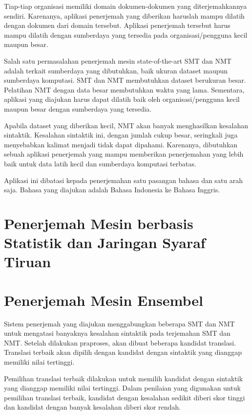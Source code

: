 \documentclass[conference]{IEEEtran}
\begin{document}
Tiap-tiap organisasi memiliki domain dokumen-dokumen yang diterjemahkannya sendiri. Karenanya, aplikasi penerjemah yang diberikan haruslah mampu dilatih dengan dokumen dari domain tersebut. Aplikasi penerjemah tersebut harus mampu dilatih dengan sumberdaya yang tersedia pada organisasi/pengguna kecil maupun besar.

Salah satu permasalahan penerjemah mesin state-of-the-art SMT dan NMT adalah terkait sumberdaya yang dibutuhkan, baik ukuran dataset maupun sumberdaya komputasi. SMT dan NMT membutuhkan dataset berukuran besar. Pelatihan NMT dengan data besar membutuhkan waktu yang lama. Sementara, aplikasi yang diajukan harus dapat dilatih baik oleh organisasi/pengguna kecil maupun besar dengan sumberdaya yang tersedia.

Apabila dataset yang diberikan kecil, NMT akan banyak menghasilkan kesalahan sintaktik. Kesalahan sintaktik ini, dengan jumlah cukup besar, seringkali juga menyebabkan kalimat menjadi tidak dapat dipahami. Karenanya, dibutuhkan sebuah aplikasi penerjemah yang mampu memberikan penerjemahan yang lebih baik untuk data latih kecil dan sumberdaya komputasi terbatas.

Aplikasi ini dibatasi kepada penerjemahan satu pasangan bahasa dan satu arah saja. Bahasa yang diajukan adalah Bahasa Indonesia ke Bahasa Inggris.

\section{Penerjemah Mesin berbasis Statistik dan Jaringan Syaraf Tiruan}

\section{Penerjemah Mesin Ensembel}

Sistem penerjemah yang diajukan menggabungkan beberapa SMT dan NMT untuk mengatasi banyaknya kesalahan sintaktik pada terjemahan SMT dan NMT. Setelah dilakukan praproses, akan dibuat beberapa kandidat translasi. Translasi terbaik akan dipilih dengan kandidat dengan sintaktik yang dianggap memiliki nilai tertinggi.

Pemilihan translasi terbaik dilakukan untuk memilih kandidat dengan sintaktik yang dianggap memiliki nilai tertinggi. Dalam penilaian yang digunakan untuk pemilihan translasi terbaik, kandidat dengan kesalahan sedikit diberi skor tinggi dan kandidat dengan banyak kesalahan diberi skor rendah.
\end{document}
